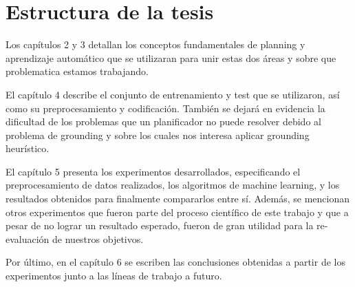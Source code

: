 \section{Estructura de la tesis}

Los capítulos 2 y 3 detallan los conceptos fundamentales de planning y
aprendizaje automático que se utilizaran para unir estas dos áreas y sobre que
problematica estamos trabajando.

El capítulo 4 describe el conjunto de entrenamiento y test que se utilizaron,
así como su preprocesamiento y codificación. También se dejará en evidencia
la dificultad de los problemas que un planificador no puede resolver debido al
problema de grounding y sobre los cuales nos interesa aplicar grounding
heurístico.

El capítulo 5 presenta los experimentos desarrollados, especificando el
preprocesamiento de datos realizados, los algoritmos de machine learning, y los
resultados obtenidos para finalmente compararlos entre sí. Además, se mencionan
otros experimentos que fueron parte del proceso científico de este trabajo y que
a pesar de no lograr un resultado esperado, fueron de gran utilidad para la
re-evaluación de nuestros objetivos.

Por último, en el capítulo 6 se escriben las conclusiones obtenidas a partir de los
experimentos junto a las líneas de trabajo a futuro.